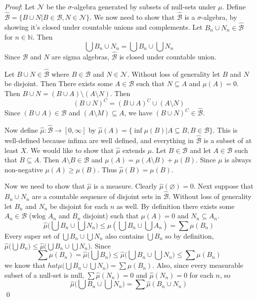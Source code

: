 \documentclass[12pt]{article}
\let\emptyset\varnothing
\renewenvironment{proof}{\hspace{-4 ex} \emph{Proof}:}{\qed}
\newcommand{\NN}{\mathbb{N}}
\begin{document}
	\begin{proof}
		Let $\mathcal{N}$ be the $\sigma$-algebra generated by subsets of null-sets under $\mu$. Define $\hat{\mathcal{B}} = \{B \cup N| B \in \mathcal{B}, N \in \mathcal{N} \}$. We now need to show that $\hat{\mathcal{B}}$ is a $\sigma$-algebra, by showing it's closed under countable unions and complements. Let $B_n\cup N_n \in \hat{\mathcal{B}}$ for $n \in \NN$. Then
		$$
		\bigcup B_n\cup N_n = \bigcup B_n \cup \bigcup N_n
		$$
		Since $\mathcal{B}$ and $N$ are sigma algebras, $\hat{\mathcal{B}}$ is closed under countable union. \bigbreak
		
		Let $B \cup N \in \hat{\mathcal{B}}$ where $B \in \mathcal{B}$ and $N \in \mathcal{N}$. Without loss of generality let $B$ and $N$ be disjoint. Then There exists some $A \in \mathcal{B}$ such that $N \subseteq A$ and $\mu(A) = 0$. Then $B \cup N = (B \cup A) \setminus (A \setminus N)$. Then
		$$
		(B \cup N)^C = (B \cup A)^C \cup (A \setminus N)
		$$
		Since $(B \cup A) \in \mathcal{B}$ and $(A \setminus M) \subseteq A$, we have $(B \cup N)^C \in \hat{\mathcal{B}}$. \bigbreak
		
		Now define $\hat{\mu}: \hat{\mathcal{B}} \to [0,\infty]$ by $\hat{\mu}(A) = \{\inf \mu(B) | A \subseteq B, B \in \mathcal{B}\}$. This is well-defined because infima are well defined, and everything in $\hat{\mathcal{B}}$ is a subset of at least $X$. We would like to show that $\hat{\mu}$ extends $\mu$. Let $B \in \mathcal{B}$ and let $A \in \mathcal{B}$ such that $B \subseteq A$. Then $A \setminus B \in \mathcal{B}$ and $\mu(A) = \mu(A \setminus B) + \mu(B)$. Since $\mu$ is always non-negative $\mu(A) \geq \mu(B)$. Thus $\hat{\mu}(B) = \mu(B)$.
		
		Now we need to show that $\hat{\mu}$ is a measure. Clearly $\hat{\mu}(\emptyset) = 0$. Next suppose that $B_n \cup N_n$ are a countable sequence of disjoint sets in $\hat{\mathcal{B}}$. Without loss of generality let $B_n$ and $N_n$ be disjoint for each $n$ as well. By definition there exists some $A_n \in \mathcal{B}$ (wlog $A_n$ and $B_n$ disjoint) such that $\mu(A) = 0$ and $N_n \subseteq A_n$.
		$$
		\hat{\mu} \Big( \bigcup B_n \cup \bigcup N_n \Big) \leq \mu(\bigcup B_n \cup \bigcup A_n) = \sum \mu(B_n)
		$$
		Every super set of $\bigcup B_n \cup \bigcup N_n$ also contains $\bigcup B_n$ so by definition, $\hat{\mu} \Big( \bigcup B_n) \leq \hat{\mu} \Big( \bigcup B_n \cup \bigcup N_n \Big)$. Since 
		$$
		\sum \mu(B_n) = \hat{\mu} \Big( \bigcup B_n) \leq \hat{\mu} \Big( \bigcup B_n \cup \bigcup N_n \Big) \leq \sum \mu(B_n)
		$$
		we know that $hat{\mu} \Big( \bigcup B_n \cup \bigcup N_n \Big) = \sum \mu(B_n)$. Also, since every measurable subset of a null-set is null, $\sum \hat{\mu}(N_n) = 0$ and $\hat{\mu}(N_n)=0$ for each $n$, so
		$$
		\hat{\mu} \Big( \bigcup B_n \cup \bigcup N_n \Big) = \sum \hat{\mu}(B_n \cup N_n)
		$$
	\end{proof}
\end{document}

